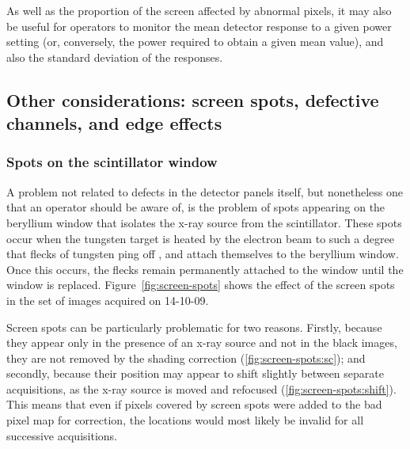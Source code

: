 \documentclass[\main/IO-Pixels.tex]{subfiles}
\begin{document}
As well as the proportion of the screen affected by abnormal pixels, it may also be useful for operators to monitor the mean detector response to a given power setting (or, conversely, the power required to obtain a given mean value), and also the standard deviation of the responses. 

\FloatBarrier
\subsection{Other considerations: screen spots, defective channels, and edge effects}

\subsubsection{Spots on the scintillator window}
\label{sec:screen-spots}

A problem not related to defects in the detector panels itself, but nonetheless one that an operator should be aware of, is the problem of spots appearing on the beryllium window that isolates the x-ray source from the scintillator. These spots occur when the tungsten target is heated by the electron beam to such a degree that flecks of tungsten ping off , and attach themselves to the beryllium window. Once this occurs, the flecks remain permanently attached to the window until the window is replaced. Figure~\ref{fig:screen-spots} shows the effect of the screen spots in the set of images acquired on 14-10-09.

Screen spots can be particularly problematic for two reasons. Firstly, because they appear only in the presence of an x-ray source and not in the black images, they are not removed by the shading correction (\ref{fig:screen-spots:sc}); and secondly, because their position may appear to shift slightly between separate acquisitions, as the x-ray source is moved and refocused  (\ref{fig:screen-spots:shift}). This means that even if pixels covered by screen spots were added to the bad pixel map for correction, the locations would most likely be invalid for all successive acquisitions. 
\end{document}
